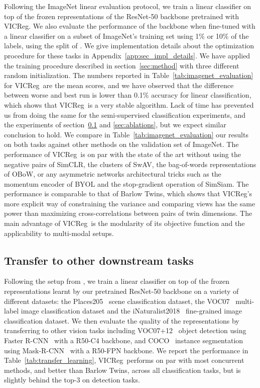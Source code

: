 \documentclass{article}
\newcommand{\algo}{VICReg}
\begin{document}
Following the ImageNet \cite{deng2009imagenet} linear evaluation protocol, we train a linear classifier on top of the frozen representations of the ResNet-50 backbone pretrained with \algo. We also evaluate the performance of the backbone when fine-tuned with a linear classifier on a subset of ImageNet's training set using 1\% or 10\% of the labels, using the split of \cite{chen2020simclr}. We give implementation details about the optimization procedure for these tasks in Appendix~\ref{app:sec_impl_details}. We have applied the training procedure described in section~\ref{sec:method} with three different random initialization. The numbers reported in Table~\ref{tab:imagenet_evaluation} for \algo \ are the mean scores, and we have observed that the difference between worse and best run is lower than 0.1\% accuracy for linear classification, which shows that \algo \ is a very stable algorithm. Lack of time has prevented us from doing the same for the semi-supervised classification experiments, and the experiments of section~\ref{sec:eval_transfer} and \ref{sec:ablations}, but we expect similar conclusion to hold. We compare in Table~\ref{tab:imagenet_evaluation} our results on both tasks against other methods on the validation set of ImageNet. The performance of \algo \ is on par with the state of the art without using the negative pairs of SimCLR, the clusters of SwAV, the bag-of-words representations of OBoW, or any asymmetric networks architectural tricks such as the momentum encoder of BYOL and the stop-gradient operation of SimSiam. The performance is comparable to that of Barlow Twins, which shows that \algo's more explicit way of constraining the variance and comparing views has the same power than maximizing cross-correlations between pairs of twin dimensions. The main advantage of \algo \ is the modularity of its objective function and the applicability to multi-modal setups.

\subsection{Transfer to other downstream tasks} \label{sec:eval_transfer}
Following the setup from \cite{misra2020pirl}, we train a linear classifier on top of the frozen representations learnt by our pretrained ResNet-50 backbone on a variety of different datasets: the Places205~\cite{zhou2014places} scene classification dataset, the VOC07~\cite{everingham2010voc} multi-label image classification dataset and the iNaturalist2018~\cite{vanhorni2018naturalist} fine-grained image classification dataset. We then evaluate the quality of the representations by transferring to other vision tasks including VOC07+12~\cite{everingham2010voc} object detection using Faster R-CNN~\cite{ren2015fasterrcnn} with a R50-C4 backbone, and COCO~\cite{lin2014coco} instance segmentation using Mask-R-CNN~\cite{he2017maskrcnn} with a R50-FPN backbone.  We report the performance in Table~\ref{tab:transfer_learning}, \algo \ performs on par with most concurrent methods, and better than Barlow Twins, across all classification tasks, but is slightly behind the top-3 on detection tasks. 
\end{document}

